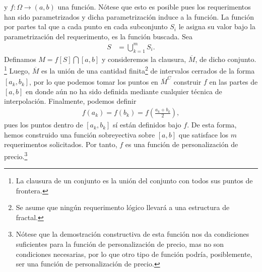 y $f: \Omega \rightarrow (a,b)$ una función. Nótese que esto es posible pues los requerimentos han sido parametrizados y dicha parametrización induce a la función. La función por partes tal que a cada punto en cada subconjunto $S_i$ le asigna su valor bajo la parametrización del requerimento, es la función buscada.  Sea 
\begin{align*}
    S &= \bigcup_{k=1}^mS_i.
\end{align*}
Definamos $M = f[S] \bigcap [a,b]$ y consideremos la clausura, $\overline{M}$, de dicho conjunto. \footnote{La clausura de un conjunto es la unión del conjunto con todos sus puntos de frontera.} Luego, $\overline{M}$ es la unión de una cantidad finita\footnote{Se asume que ningún requerimento lógico llevará a una estructura de fractal.} de intervalos cerrados de la forma $[a_k,b_k]$, por lo que podemos tomar los puntos en $\overline{M}^C$ construir $f$ en las partes de $[a,b]$ en donde aún no ha sido definida mediante cualquier técnica de interpolación. Finalmente, podemos definir
\begin{align*}
    f(a_k) = f(b_k) = f\left(\frac{a_k+b_k}{2}\right), 
\end{align*}
pues los puntos dentro de $[a_k,b_k]$ sí están definidos bajo $f$. De esta forma, hemos construido una función sobreyectiva sobre $[a,b]$ que satisface los $m$ requerimentos solicitados. Por tanto, $f$ es una función de personalización de precio.\footnote{Nótese que la demostración constructiva de esta función nos da condiciones suficientes para la función de personalización de precio, mas no son condiciones necesarias, por lo que otro tipo de función podría, posiblemente, ser una función de personalización de precio.}


